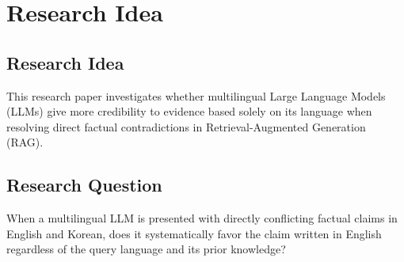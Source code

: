 \section{Research Idea}
\label{sec:research_idea}

\subsection{Research Idea}

This research paper investigates whether multilingual Large Language Models (LLMs) give more credibility to evidence based solely on its language when resolving direct factual contradictions in Retrieval-Augmented Generation (RAG).

\subsection{Research Question}

When a multilingual LLM is presented with directly conflicting factual claims in English and Korean, does it systematically favor the claim written in English regardless of the query language and its prior knowledge?
